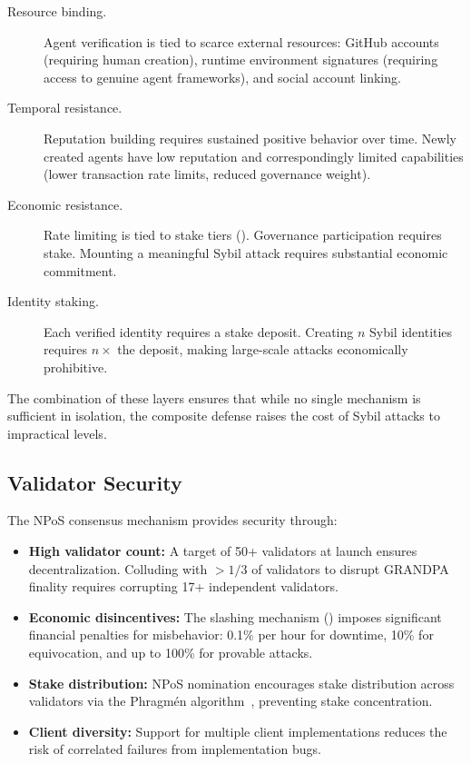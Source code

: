 \begin{description}
    \item[Resource binding.] Agent verification is tied to scarce external resources: GitHub accounts (requiring human creation), runtime environment signatures (requiring access to genuine agent frameworks), and social account linking.
    
    \item[Temporal resistance.] Reputation building requires sustained positive behavior over time. Newly created agents have low reputation and correspondingly limited capabilities (lower transaction rate limits, reduced governance weight).
    
    \item[Economic resistance.] Rate limiting is tied to stake tiers (). Governance participation requires stake. Mounting a meaningful Sybil attack requires substantial economic commitment.
    
    \item[Identity staking.] Each verified identity requires a stake deposit. Creating $n$ Sybil identities requires $n \times$ the deposit, making large-scale attacks economically prohibitive.
\end{description}

\noindent The combination of these layers ensures that while no single mechanism is sufficient in isolation, the composite defense raises the cost of Sybil attacks to impractical levels.

\subsection{Validator Security}

The NPoS consensus mechanism provides security through:

\begin{itemize}[nosep]
    \item \textbf{High validator count:} A target of 50+ validators at launch ensures decentralization. Colluding with $>1/3$ of validators to disrupt GRANDPA finality requires corrupting 17+ independent validators.
    
    \item \textbf{Economic disincentives:} The slashing mechanism () imposes significant financial penalties for misbehavior: 0.1\% per hour for downtime, 10\% for equivocation, and up to 100\% for provable attacks.
    
    \item \textbf{Stake distribution:} NPoS nomination encourages stake distribution across validators via the Phragm\'{e}n algorithm~\citep{phragmen2019}, preventing stake concentration.
    
    \item \textbf{Client diversity:} Support for multiple client implementations reduces the risk of correlated failures from implementation bugs.
\end{itemize}

